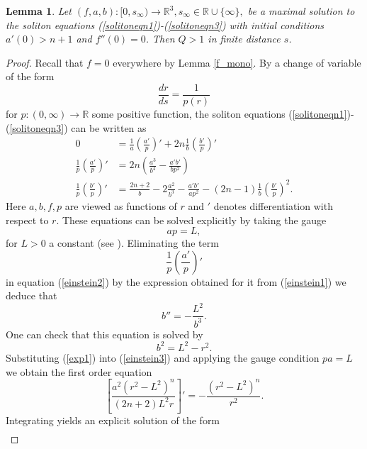 \documentclass{amsart}
\newtheorem{lem}[thm]{Lemma}
\theoremstyle{definition}
\theoremstyle{remark}
\numberwithin{equation}{section}
\newcommand{\R}{\mathbb{R}}  %
\begin{document}
\begin{lem}
\label{intersect}
Let $(f,a,b): [0, s_\infty) \rightarrow \R^3, s_\infty \in \R \cup \{ \infty \},$ be a maximal solution to the soliton equations (\ref{solitoneqn1})-(\ref{solitoneqn3}) with initial conditions $a'(0)>n+1$ and $f''(0) = 0$. Then $Q>1$ in finite distance $s$.
\end{lem}
\begin{proof}
Recall that $f = 0$ everywhere by Lemma \ref{f_mono}. By a change of variable of the form 
$$\frac{dr}{ds} = \frac{1}{p(r)}$$ 
for $p: (0, \infty) \rightarrow \R$ some positive function, the soliton equations (\ref{solitoneqn1})-(\ref{solitoneqn3}) can be written as
\begin{align}
\label{einstein1} 0 &= \frac{1}{a} \left(\frac{a'}{p}\right)' + 2n \frac{1}{b} \left(\frac{b'}{p}\right)' \\
\label{einstein2} \frac{1}{p} \left(\frac{a'}{p}\right)' &= 2n\left(\frac{a^3}{b^4} - \frac{a'b'}{bp^2}\right) \\
\label{einstein3} \frac{1}{p} \left(\frac{b'}{p}\right)' &= \frac{2n+2}{b}-2\frac{a^2}{b^3} - \frac{a'b'}{ap^2} - (2n-1)\frac{1}{b}\left(\frac{b'}{p}\right)^2.
\end{align}
Here $a,b,f,p$ are viewed as functions of $r$ and $'$ denotes differentiation with respect to $r$. These equations can be solved explicitly by taking the gauge 
\begin{equation*}
ap = L,
\end{equation*} 
for $L > 0$ a constant (see \cite{PP87}). Eliminating the term 
\begin{equation*}
\frac{1}{p} \left(\frac{a'}{p}\right)'
\end{equation*} 
in equation (\ref{einstein2}) by the expression obtained for it from (\ref{einstein1}) we deduce that
\begin{equation*}
b'' = - \frac{L^2}{b^3}.
\end{equation*}
One can check that this equation is solved by
\begin{equation}
\label{exp1}
b^2 = L^2-r^2.
\end{equation}
Substituting (\ref{exp1}) into (\ref{einstein3}) and applying the gauge condition $pa = L$ we obtain the first order equation 
\begin{equation*}
\left[\frac{a^2(r^2-L^2)^n}{(2n+2)L^2r} \right]' = - \frac{(r^2-L^2)^n}{r^2}.
\end{equation*}
Integrating yields an explicit solution of the form
\begin{align*}

\end{align*}
\end{proof}
\end{document}

